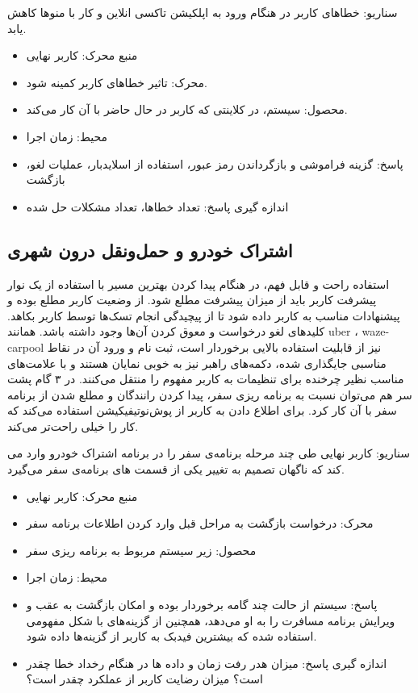 سناریو: خطاهای کاربر در هنگام ورود به اپلکیشن تاکسی انلاین و کار با منوها کاهش یابد.
\begin{itemize}
\item
منبع محرک: کاربر نهایی 
\item
محرک: تاثیر خطاهای کاربر کمینه شود. 
\item
محصول:  سیستم، در کلاینتی که کاربر در حال حاضر با آن کار می‌کند.
\item
محیط: زمان اجرا
\item
پاسخ:  گزینه فراموشی و بازگرداندن رمز عبور، استفاده از اسلایدبار، عملیات لغو، بازگشت 
\item
اندازه گیری پاسخ: تعداد خطاها، تعداد مشکلات حل شده 
\end{itemize}

\subsection{اشتراک خودرو و حمل‌و‌نقل درون شهری}
استفاده راحت و قابل فهم، در هنگام پیدا کردن بهترین مسیر با استفاده از یک نوار پیشرفت کاربر باید از میزان پیشرفت مطلع شود. از وضعیت کاربر مطلع بوده و پیشنهادات مناسب به کاربر داده شود تا از پیچیدگی انجام تسک‌ها توسط کاربر بکاهد. کلیدهای لغو درخواست و معوق کردن آن‌ها وجود داشته باشد.
همانند uber ، waze-carpool نیز از قابلیت استفاده بالایی برخوردار است، ثبت نام و ورود آن در نقاط مناسبی جایگذاری شده، دکمه‌های راهبر نیز به خوبی نمایان هستند و با علامت‌های مناسب نظیر چرخنده برای تنظیمات به کاربر مفهوم را منتقل می‌کنند. در ۳ گام پشت سر هم می‌توان نسبت به برنامه ریزی سفر، پیدا کردن رانندگان و مطلع شدن از برنامه سفر با آن کار کرد.
برای اطلاع دادن به کاربر از پوش‌نوتیفیکیشن استفاده می‌کند که کار را خیلی راحت‌تر می‌کند.

سناریو: کاربر نهایی طی چند مرحله برنامه‌ی سفر را در برنامه اشتراک خودرو وارد می کند که ناگهان تصمیم به تغییر یکی از قسمت های برنامه‌ی سفر می‌گیرد.
\begin{itemize}
\item
منبع محرک: کاربر نهایی 
\item
محرک: درخواست بازگشت به مراحل قبل وارد کردن اطلاعات برنامه سفر  
\item
محصول:  زیر سیستم مربوط به برنامه ریزی سفر 
\item
محیط: زمان اجرا
\item
پاسخ: سیستم از حالت چند گامه برخوردار بوده و امکان بازگشت به عقب و ویرایش برنامه مسافرت را به او می‌دهد، همچنین از گزینه‌های با شکل مفهومی استفاده شده که بیشترین فیدبک به کاربر از گزینه‌ها داده شود.
\item
اندازه گیری پاسخ:  میزان هدر رفت زمان و داده ها در هنگام رخداد خطا چقدر است؟ میزان رضایت کاربر از عملکرد چقدر است؟  
\end{itemize}

